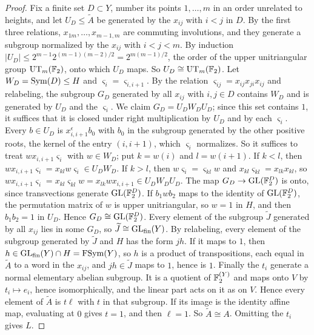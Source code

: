 \begin{proof}
Fix a finite set $D\subset Y$, number its points $1,\dots,m$ in an order unrelated to heights, and let $U_D\le\widetilde A$ be generated by the
$x_{ij}$ with $i<j$ in $D$. By the first three relations, $x_{1m},\dots,x_{m-1,m}$ are commuting involutions, and they generate a subgroup
normalized by the $x_{ij}$ with $i<j<m$. By induction $|U_D|\le2^{m-1}2^{(m-1)(m-2)/2}=2^{m(m-1)/2}$, the order of the upper unitriangular
group $\mathrm{UT}_m(\mathbb F_2)$, onto which $U_D$ maps. So $U_D\cong\mathrm{UT}_m(\mathbb F_2)$. Let $W_D=\operatorname{Sym}(D)\le H$ and $\varsigma_i=\varsigma_{i,i+1}$. By
the relation $\varsigma_{ij}=x_{ij}x_{ji}x_{ij}$ and relabeling, the subgroup $G_D$ generated by all $x_{ij}$ with $i,j\in D$ contains $W_D$ and is
generated by $U_D$ and the $\varsigma_i$. We claim $G_D=U_DW_DU_D$; since this set contains $1$, it suffices that it is closed under right
multiplication by $U_D$ and by each $\varsigma_i$. Every $b\in U_D$ is $x_{i,i+1}^\epsilon b_0$ with $b_0$ in the subgroup generated by the other
positive roots, the kernel of the entry $(i,i+1)$, which $\varsigma_i$ normalizes. So it suffices to treat $wx_{i,i+1}\varsigma_i$ with $w\in W_D$;
put $k=w(i)$ and $l=w(i+1)$. If $k<l$, then $wx_{i,i+1}\varsigma_i=x_{kl}w\varsigma_i\in U_DW_D$. If $k>l$, then $w\varsigma_i=\varsigma_{kl}w$ and
$x_{kl}\varsigma_{kl}=x_{lk}x_{kl}$, so $wx_{i,i+1}\varsigma_i=x_{kl}\varsigma_{kl}w=x_{lk}wx_{i,i+1}\in U_DW_DU_D$. The map $G_D\to\operatorname{GL}(\mathbb F_2^D)$ is
onto, since transvections generate $\operatorname{GL}(\mathbb F_2^D)$. If $b_1wb_2$ maps to the identity of $\operatorname{GL}(\mathbb F_2^D)$, the permutation matrix of $w$ is upper
unitriangular, so $w=1$ in $H$, and then $b_1b_2=1$ in $U_D$. Hence $G_D\cong\operatorname{GL}(\mathbb F_2^D)$. Every element of the subgroup $\widetilde J$ generated
by all $x_{ij}$ lies in some $G_D$, so $\widetilde J\cong\operatorname{GL}_{\rm fin}(Y)$. By relabeling, every element of the subgroup generated by $\widetilde J$
and $H$ has the form $jh$. If it maps to $1$, then $h\in\operatorname{GL}_{\rm fin}(Y)\cap H=\operatorname{FSym}(Y)$, so $h$ is a product of transpositions, each equal in
$\widetilde A$ to a word in the $x_{ij}$, and $jh\in\widetilde J$ maps to $1$, hence is $1$. Finally the $t_i$ generate a normal elementary abelian
subgroup. It is a quotient of $\mathbb F_2^{(Y)}$ and maps onto $V$ by $t_i\mapsto e_i$, hence isomorphically, and the linear part acts on it as on $V$.
Hence every element of $\widetilde A$ is $t\ell$ with $t$ in that subgroup. If its image is the identity affine map, evaluating at $0$ gives
$t=1$, and then $\ell=1$. So $\widetilde A\cong A$. Omitting the $t_i$ gives $L$.


\end{proof}
